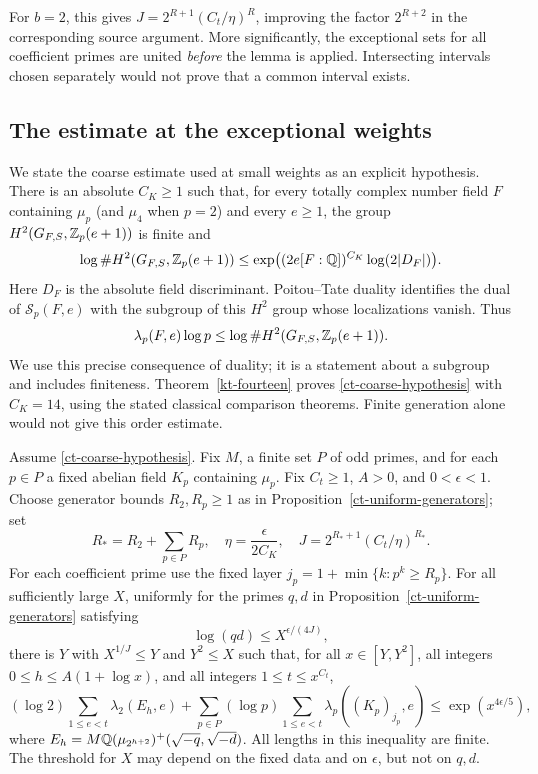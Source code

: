 For $b=2$, this gives $J=2^{R+1}(C_t/\eta)^R$, improving the
factor $2^{R+2}$ in the corresponding source argument. More
significantly, the exceptional sets for all coefficient primes are
united \emph{before} the lemma is applied. Intersecting intervals
chosen separately would not prove that a common interval exists.

\subsection{The estimate at the exceptional weights}

We state the coarse estimate used at small weights as an explicit
hypothesis. There is an absolute $C_K\ge1$ such that, for every
totally complex number field $F$ containing $\mu_p$ (and $\mu_4$
when $p=2$) and every $e\ge1$, the group
$H^2(G_{F,S},\mathbb Z_p(e+1))$ is finite and
\begin{equation}
 \label{ct-coarse-hypothesis}
 \log\#H^2(G_{F,S},\mathbb Z_p(e+1))
 \le \exp\bigl((2e[F:\mathbb Q])^{C_K}\log(2|D_F|)\bigr).
\end{equation}
Here $D_F$ is the absolute field discriminant. Poitou--Tate
duality identifies the dual of $\mathcal S_p(F,e)$ with the
subgroup of this $H^2$ group whose localizations vanish. Thus
\begin{equation}
 \label{ct-small-weight}
 \lambda_p(F,e)\log p
 \le \log\#H^2(G_{F,S},\mathbb Z_p(e+1)).
\end{equation}
We use this precise consequence of duality; it is a statement
about a subgroup and includes finiteness. Theorem~\ref{kt-fourteen}
proves \eqref{ct-coarse-hypothesis} with $C_K=14$, using the
stated classical comparison theorems. Finite generation alone
would not give this order estimate.

\begin{proposition}
\label{ct-conditional-interval}
Assume \eqref{ct-coarse-hypothesis}. Fix $M$, a finite set $P$ of
odd primes, and for each $p\in P$ a fixed abelian field $K_p$
containing $\mu_p$. Fix $C_t\ge1$, $A>0$, and $0<\epsilon<1$.
Choose generator bounds $R_2,R_p\ge1$ as in
Proposition~\ref{ct-uniform-generators}; set
\[
 R_*=R_2+\sum_{p\in P}R_p,\quad
 \eta=\frac{\epsilon}{2C_K},\quad
 J=2^{R_*+1}(C_t/\eta)^{R_*}.
\]
For each coefficient prime use the fixed layer
$j_p=1+\min\{k:p^k\ge R_p\}$.
For all sufficiently large $X$, uniformly for the primes $q,d$
in Proposition~\ref{ct-uniform-generators} satisfying
\[
                     \log(qd)\le X^{\epsilon/(4J)},
\]
there is $Y$ with $X^{1/J}\le Y$ and $Y^2\le X$ such that,
for all $x\in[Y,Y^2]$, all integers $0\le h\le A(1+\log x)$,
and all integers $1\le t\le x^{C_t}$,
\begin{equation}
 \label{ct-summed-bound}
 (\log2)\sum_{1\le e<t}\lambda_2(E_h,e)
   +\sum_{p\in P}(\log p)
          \sum_{1\le e<t}\lambda_p((K_p)_{j_p},e)
        \le \exp(x^{4\epsilon/5}),
\end{equation}
where
$E_h=M\mathbb Q(\mu_{2^{h+2}})^+(\sqrt{-q},\sqrt{-d})$.
All lengths in this inequality are finite. The threshold for $X$
may depend on the fixed data and on $\epsilon$, but not on $q,d$.
\end{proposition}


